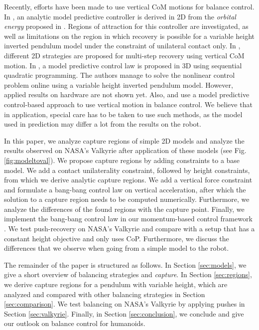 \documentclass[letterpaper, 10 pt, conference]{ieeeconf}  %
\begin{document}
Recently, efforts have been made to use vertical CoM motions for balance control. In \cite{koolen2016balance}, an analytic model predictive controller is derived in 2D from the \textit{orbital energy} proposed in \cite{pratt2007derivation}. Regions of attraction for this controller are investigated, as well as limitations on the region in which recovery is possible for a variable height inverted pendulum model under the constraint of unilateral contact only. In \cite{gao2017increase}, different 2D strategies are proposed for multi-step recovery using vertical CoM motion. In \cite{caron2018balance}, a model predictive control law is proposed in 3D using sequential quadratic programming. The authors manage to solve the nonlinear control problem online using a variable height inverted pendulum model. However, applied results on hardware are not shown yet. Also, \cite{koolen2016balance} and \cite{caron2018balance} use a model predictive control-based approach to use vertical motion in balance control. We believe that in application, special care has to be taken to use such methods, as the model used in prediction may differ a lot from the results on the robot.

In this paper, we analyze capture regions of simple 2D models and analyze the results observed on NASA's Valkyrie after application of these models (see Fig. \ref{fig:modeltoval}). We propose capture regions by adding constraints to a base model. We add a contact unilaterality constraint, followed by height constraints, from which we derive analytic capture regions. We add a vertical force constraint and formulate a bang-bang control law on vertical acceleration, after which the solution to a capture region needs to be computed numerically. Furthermore, we analyze the differences of the found regions with the capture point. Finally, we implement the bang-bang control law in our momentum-based control framework \cite{koolen2016design}. We test push-recovery on NASA's Valkyrie \cite{radford2015valkyrie} and compare with a setup that has a constant height objective and only uses CoP. Furthermore, we discuss the differences that we observe when going from a simple model to the robot.

The remainder of the paper is structured as follows. In Section \ref{sec:models}, we give a short overview of balancing strategies  and \textit{capture}. In Section \ref{sec:regions}, we derive capture regions for a pendulum with variable height, which are analyzed and compared with other balancing strategies in Section \ref{sec:comparison}. We test balancing on NASA's Valkyrie by applying pushes in Section \ref{sec:valkyrie}. Finally, in Section \ref{sec:conclusion}, we conclude and give our outlook on balance control for humanoids.
\end{document}
